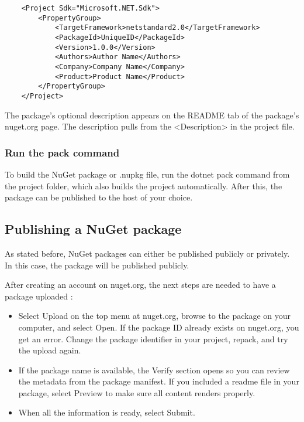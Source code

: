 \begin{verbatim}
    <Project Sdk="Microsoft.NET.Sdk">
        <PropertyGroup>
            <TargetFramework>netstandard2.0</TargetFramework>
            <PackageId>UniqueID</PackageId>
            <Version>1.0.0</Version>
            <Authors>Author Name</Authors>
            <Company>Company Name</Company>
            <Product>Product Name</Product>
        </PropertyGroup>
    </Project>
\end{verbatim}

The package's optional description appears on the README tab of the package's nuget.org page. The description pulls from the <Description> in the project file.

\subsubsection{Run the pack command}

To build the NuGet package or .nupkg file, run the dotnet pack command from the project folder, which also builds the project automatically. After this, the package can be published to the host of your choice.

\subsection{Publishing a NuGet package}

As stated before, NuGet packages can either be published publicly or privately. In this case, the package will be published publicly.

After creating an account on nuget.org, the next steps are needed to have a package uploaded \autocite{Microsoft2022c}:

\begin{itemize}
    \item Select Upload on the top menu at nuget.org, browse to the package on your computer, and select Open. If the package ID already exists on nuget.org, you get an error. Change the package identifier in your project, repack, and try the upload again.
    \item If the package name is available, the Verify section opens so you can review the metadata from the package manifest. If you included a readme file in your package, select Preview to make sure all content renders properly.
    \item When all the information is ready, select Submit.
\end{itemize}



